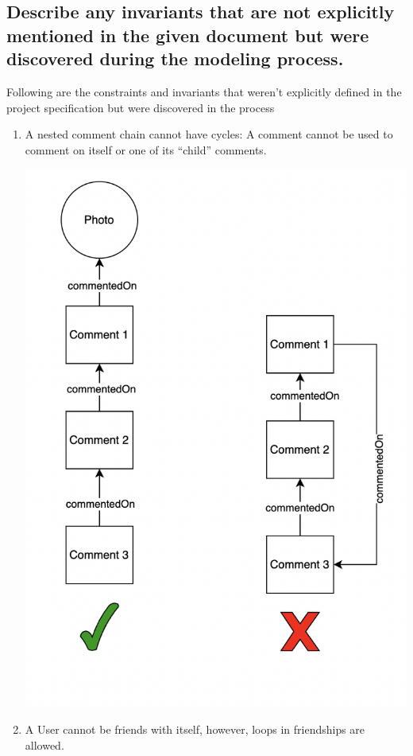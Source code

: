 \documentclass[titlepage]{article}
\begin{document}
\subsection{Describe any invariants that are not explicitly mentioned in the given document but were discovered during the modeling process.}
Following are the constraints and invariants that weren’t explicitly defined in the project specification but were discovered in the process
\begin{enumerate}
	\item A nested comment chain cannot have cycles: A comment cannot be used to comment on itself or one of its “child” comments.

	      \includegraphics[width=5in]{images/invariant_1.png}

	\item A User cannot be friends with itself, however, loops in friendships are allowed.


\end{enumerate}
\end{document}
